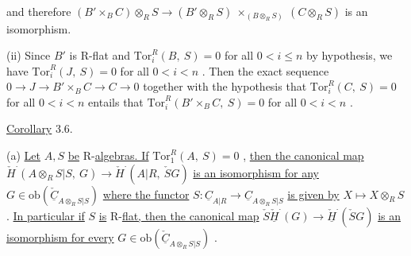 and therefore $(B'\times_B C)\otimes_R S \to (B'\otimes_R S)\ \times_{(B\otimes_R S)}\ (C \otimes_R S)$  is an isomorphism.

(ii)  Since  $B'$  is R-flat and  $\mathrm{Tor}^R_i(B,\ S) = 0$  for all  $0 < i \leq n$   by hypothesis, we have  $\mathrm{Tor}^R_i(J,\ S) = 0$  for all  $0 < i < n$  . Then the exact sequence  $0 \to J \to B'\times_B C \to C \to 0$  together with the hypothesis that  $\mathrm{Tor}^R_i(C,\ S) = 0$  for all  $0 < i < n$  entails that  $\mathrm{Tor}^R_i(B'\times_B C,\ S) = 0$  for all  $0 < i < n$  .


\underline{Corollary} 3.6.

(a)  \underline{Let}  $A, S$  \underline{be} R-\underline{algebras. If}  $\mathrm{Tor}^R_1(A,\ S) = 0$  , \underline{then the canonical map}  $\check{H}^{\cdot}(A\otimes_R S|S,\ G) \to \check{H}^{\cdot}(A|R,\ \check{S}G)$  \underline{is an isomorphism for any}  $G \in \mathrm{ob}(\check{\underline{C}}_{A\otimes_R S|S})$  \underline{where the functor}  $S : \underline{C}_{A|R} \to \underline{C}_{A\otimes_R S|S}$  \underline{is given by}  $X \longmapsto X\otimes_R S$  . \underline{In particular if}  $S$  \underline{is} R-\underline{flat, then the canonical map}  $\check{S}\underline{\check{H}}^{\cdot}(G) \to \underline{\check{H}}^{\cdot}(\check{S}G)$  \underline{is an isomorphism for every}  $G \in \mathrm{ob}(\check{\underline{C}}_{A\otimes_R S|S})$  .

